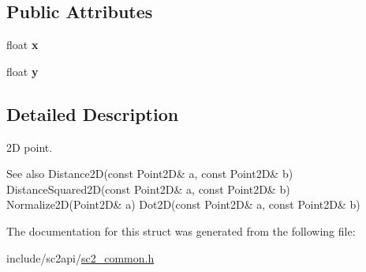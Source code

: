 \subsection*{Public Attributes}
\begin{DoxyCompactItemize}
\item 
\mbox{\label{structsc2_1_1_point2_d_aee46b1a1c9862b36d48b7e8eb7f67b35}} 
float {\bfseries x}
\item 
\mbox{\label{structsc2_1_1_point2_d_aacb47402f8fb86978830360e56a72d92}} 
float {\bfseries y}
\end{DoxyCompactItemize}


\subsection{Detailed Description}
2D point. \begin{DoxySeeAlso}{See also}
Distance2\+D(const Point2\+D\& a, const Point2\+D\& b) Distance\+Squared2\+D(const Point2\+D\& a, const Point2\+D\& b) Normalize2\+D(\+Point2\+D\& a) Dot2\+D(const Point2\+D\& a, const Point2\+D\& b) 
\end{DoxySeeAlso}


The documentation for this struct was generated from the following file\+:\begin{DoxyCompactItemize}
\item 
include/sc2api/\hyperlink{sc2__common_8h}{sc2\+\_\+common.\+h}\end{DoxyCompactItemize}
